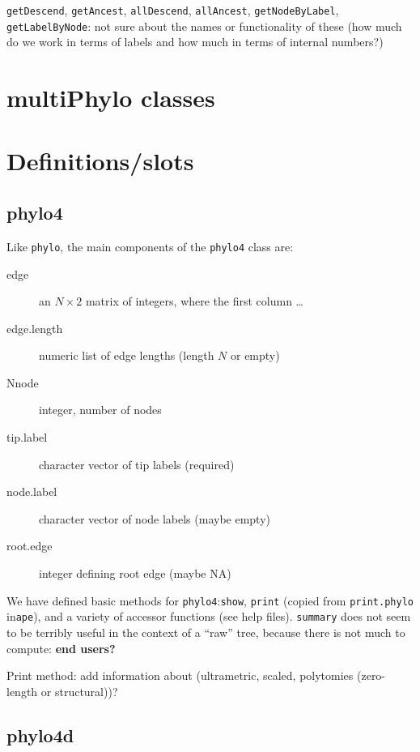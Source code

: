 \documentclass{article}
\newcommand{\code}[1]{{{\tt #1}}}
\begin{document}
\code{getDescend}, \code{getAncest},
\code{allDescend}, \code{allAncest},
\code{getNodeByLabel}, \code{getLabelByNode}:
not sure about the names or functionality of these (how much do we work in terms of labels and how much in terms of internal numbers?)

\section{multiPhylo classes}



\appendix
\section{Definitions/slots}

\subsection{phylo4}
Like \code{phylo}, the main components of
the \code{phylo4} class are:
\begin{description}
\item[edge]{an $N \times 2$ matrix of integers,
  where the first column \ldots}
\item[edge.length]{numeric list of edge lengths
(length $N$ or empty)}
\item[Nnode]{integer, number of nodes}
\item[tip.label]{character vector of tip labels (required)}
\item[node.label]{character vector of node labels (maybe empty)}
\item[root.edge]{integer defining root edge (maybe NA)}
\end{description}

We have defined basic methods for \code{phylo4}:\code{show}, \code{print} (copied from \code{print.phylo} in\code{ape}), and a variety of accessor functions (see help files). \code{summary} does not seem to be terribly useful in the context of a ``raw'' tree, because there is not much to compute: \textbf{end users?}

Print method: add information about (ultrametric, scaled, polytomies (zero-length or structural))?

\subsection{phylo4d}
\end{document}
